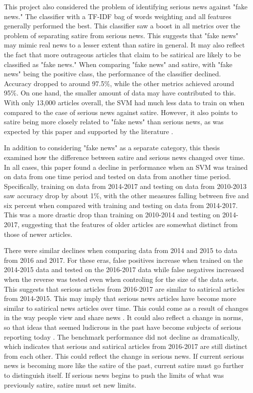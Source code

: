 \documentclass [12 pt] {report}
\begin{document}
This project also considered the problem of identifying serious news against "fake news." The classifier with a TF-IDF bag of words weighting and all features generally performed the best. This classifier saw a boost in all metrics over the problem of separating satire from serious news. This suggests that "fake news" may mimic real news to a lesser extent than satire in general. It may also reflect the fact that more outrageous articles that claim to be satirical are likely to be classified as "fake news." When comparing "fake news" and satire, with "fake news" being the positive class, the performance of the classifier declined. Accuracy dropped to around 97.5\%, while the other metrics achieved around 95\%. On one hand, the smaller amount of data may have contributed to this. With only 13,000 articles overall, the SVM had much less data to train on when compared to the case of serious news against satire. However, it also points to satire being more closely related to "fake news" than serious news, as was expected by this paper and supported by the literature \cite{Horne}.

In addition to considering "fake news" as a separate category, this thesis examined how the difference between satire and serious news changed over time. In all cases, this paper found a decline in performance when an SVM was trained on data from one time period and tested on data from another time period. Specifically, training on data from 2014-2017 and testing on data from 2010-2013 saw accuracy drop by about 1\%, with the other measures falling between five and six percent when compared with training and testing on data from 2014-2017. This was a more drastic drop than training on 2010-2014 and testing on 2014-2017, suggesting that the features of older articles are somewhat distinct from those of newer articles. 

There were similar declines when comparing data from 2014 and 2015 to data from 2016 and 2017. For these eras, false positives increase when trained on the 2014-2015 data and tested on the 2016-2017 data while false negatives increased when the reverse was tested even when controling for the size of the data sets. This suggests that serious articles from 2016-2017 are similar to satirical articles from 2014-2015. This may imply that serious news articles have become more similar to satirical news articles over time. This could come as a result of changes in the way people view and share news \cite{Gottfried}\cite{Shearer}\cite{newsSharing}. It could also reflect a change in norms, so that ideas that seemed ludicrous in the past have become subjects of serious reporting today \cite{norms}. The benchmark performance did not decline as dramatically, which indicates that serious and satirical articles from 2016-2017 are still distinct from each other. This could reflect the change in serious news. If current serious news is becoming more like the satire of the past, current satire must go further to distinguish itself. If serious news begins to push the limits of what was previously satire, satire must set new limits.
\end{document}
